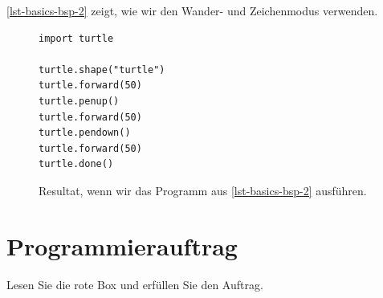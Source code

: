 \begin{example}

\autoref{lst-basics-bsp-2} zeigt, wie wir den Wander- und Zeichenmodus verwenden.

\begin{figure}[htb]
\centering
\begin{minipage}{0.5\linewidth}
\centering
\begin{lstlisting}[caption={Beispielprogramm, welches die Figur aus \autoref{figure-basics-bsp-2} zeichnet (\graybgtexttt{bsp\_2.py}).}, label=lst-basics-bsp-2, showspaces=true]
import turtle

turtle.shape("turtle")
turtle.forward(50)
turtle.penup()
turtle.forward(50)
turtle.pendown()
turtle.forward(50)
turtle.done()
\end{lstlisting}
\end{minipage}
\hfill
\begin{minipage}[c]{0.4\linewidth}
\centering
{}
\caption{Resultat, wenn wir das Programm aus \autoref{lst-basics-bsp-2} ausführen.}
\label{figure-basics-bsp-2}
\end{minipage}
\end{figure}

\end{example}

\section{Programmierauftrag}

Lesen Sie die rote Box und erfüllen Sie den Auftrag.

